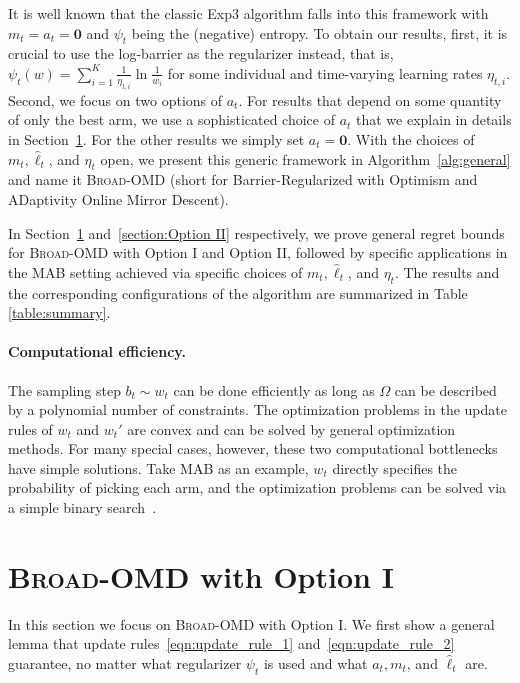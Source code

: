 \documentclass[final, 12pt]{colt2018} %
\begin{document}
It is well known that the classic Exp3 algorithm falls into this framework with $m_t = a_t = \mathbf{0}$ and $\psi_t$ being the (negative) entropy.
To obtain our results, first, it is crucial to use the log-barrier as the regularizer instead, that is, $\psi_t(w)=\sum_{i=1}^K \frac{1}{\eta_{t,i}}\ln\frac{1}{w_i}$
for some individual and time-varying learning rates $\eta_{t,i}$.
Second, we focus on two options of $a_t$.
For results that depend on some quantity of only the best arm, we use a sophisticated choice of $a_t$ that we explain in details in Section~\ref{section:Option I}.
For the other results we simply set $a_t = \mathbf{0}$.
With the choices of $m_t, \hat{\ell}_t$, and $\eta_{t}$ open, we present this generic framework in Algorithm~\ref{alg:general}
and name it \textsc{Broad-OMD} (short for Barrier-Regularized with Optimism and ADaptivity Online Mirror Descent).

In Section~\ref{section:Option I} and~\ref{section:Option II} respectively, we prove general regret bounds for \textsc{Broad-OMD} 
with Option I and Option II, followed by specific applications in the MAB setting achieved via specific choices of $m_{t}, \hat{\ell}_t$, and $\eta_{t}$.
The results and the corresponding configurations of the algorithm are summarized in Table \ref{table:summary}.  



\paragraph{Computational efficiency.} 
The sampling step $b_t \sim w_t$ can be done efficiently as long as $\Omega$ can be described by a polynomial number of constraints.
The optimization problems in the update rules of $w_t$ and $w_t'$ are convex and can be solved by general optimization methods.
For many special cases, however, these two computational bottlenecks have simple solutions.
Take MAB as an example, $w_t$ directly specifies the probability of picking each arm,
and the optimization problems can be solved via a simple binary search~\citep{agarwal2017corralling}.


\section{\textsc{Broad-OMD} with Option I}
\label{section:Option I}
In this section we focus on \textsc{Broad-OMD} with Option I.
We first show a general lemma that update rules~\eqref{eqn:update_rule_1} and~\eqref{eqn:update_rule_2} guarantee,
no matter what regularizer $\psi_t$ is used and what $a_t, m_t$, and $\hat{\ell}_t$ are.
\end{document}
